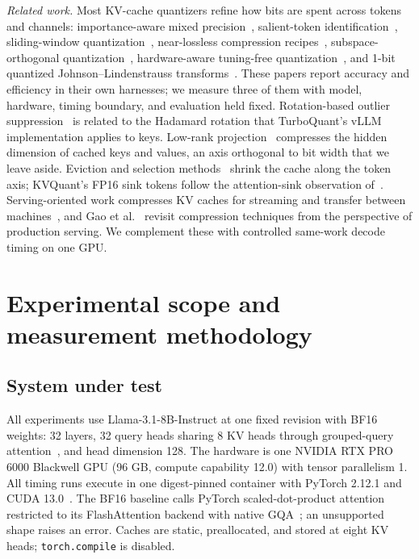 \documentclass{article}
\begin{document}
\textit{Related work.} Most KV-cache quantizers refine how bits are spent across tokens and channels: importance-aware mixed precision~\citep{yang_notokenleft}, salient-token identification~\citep{he_zipcache}, sliding-window quantization~\citep{duanmu_skvq}, near-lossless compression recipes~\citep{kang_gear}, subspace-orthogonal quantization~\citep{wang_squat}, hardware-aware tuning-free quantization~\citep{tayaranian_innerq}, and 1-bit quantized Johnson--Lindenstrauss transforms~\citep{zandieh_qjl}.
These papers report accuracy and efficiency in their own harnesses; we measure three of them with model, hardware, timing boundary, and evaluation held fixed.
Rotation-based outlier suppression~\citep{ashkboos_quarot,feng_hadamard} is related to the Hadamard rotation that TurboQuant's vLLM implementation applies to keys.
Low-rank projection~\citep{chang_palu} compresses the hidden dimension of cached keys and values, an axis orthogonal to bit width that we leave aside.
Eviction and selection methods~\citep{zhang_h2o,li_snapkv,cai_pyramidkv,xiao_duoattention,devoto_expected,chari_compactor} shrink the cache along the token axis; KVQuant's FP16 sink tokens follow the attention-sink observation of~\citep{xiao_streaming}.
Serving-oriented work compresses KV caches for streaming and transfer between machines~\citep{liu_cachegen,liu_kvserve}, and Gao et al.~\citep{gao_rethinking} revisit compression techniques from the perspective of production serving.
We complement these with controlled same-work decode timing on one GPU.

\section{Experimental scope and measurement methodology}
\label{sec:method}

\subsection{System under test}
\label{sec:sut}

All experiments use Llama-3.1-8B-Instruct at one fixed revision with BF16 weights: 32 layers, 32 query heads sharing 8 KV heads through grouped-query attention~\citep{ainslie_gqa}, and head dimension 128.
The hardware is one NVIDIA RTX PRO 6000 Blackwell GPU (96 GB, compute capability 12.0) with tensor parallelism 1.
All timing runs execute in one digest-pinned container with PyTorch 2.12.1 and CUDA 13.0~\citep{paszke_pytorch}.
The BF16 baseline calls PyTorch scaled-dot-product attention restricted to its FlashAttention backend with native GQA~\citep{dao_flashattention2}; an unsupported shape raises an error.
Caches are static, preallocated, and stored at eight KV heads; \texttt{torch.compile} is disabled.
\end{document}
